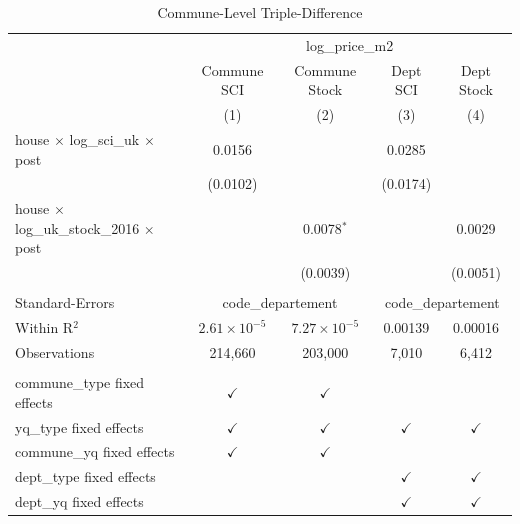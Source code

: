 
\begin{table}[htbp]
   \caption{\label{tab:commune} Commune-Level Triple-Difference}
   \bigskip
   \centering
   \begin{tabular}{lcccc}
      \toprule
       & \multicolumn{4}{c}{log\_price\_m2}\\
                                                             & Commune SCI           & Commune Stock         & Dept SCI      & Dept Stock \\   
                                                             & (1)                   & (2)                   & (3)           & (4)\\  
      \midrule 
      house $\times$ log\_sci\_uk $\times$ post              & 0.0156                &                       & 0.0285        &   \\   
                                                             & (0.0102)              &                       & (0.0174)      &   \\   
      house $\times$ log\_uk\_stock\_2016 $\times$ post      &                       & 0.0078$^{*}$          &               & 0.0029\\   
                                                             &                       & (0.0039)              &               & (0.0051)\\   
       \\
      Standard-Errors & \multicolumn{2}{c}{code\_departement} & \multicolumn{2}{c}{code\_departement} \\
      Within R$^2$                                           & $2.61\times 10^{-5}$  & $7.27\times 10^{-5}$  & 0.00139       & 0.00016\\  
      Observations                                           & 214,660               & 203,000               & 7,010         & 6,412\\  
       \\
      commune\_type fixed effects                            & $\checkmark$          & $\checkmark$          &               & \\  
      yq\_type fixed effects                                 & $\checkmark$          & $\checkmark$          & $\checkmark$  & $\checkmark$\\   
      commune\_yq fixed effects                              & $\checkmark$          & $\checkmark$          &               & \\  
      dept\_type fixed effects                               &                       &                       & $\checkmark$  & $\checkmark$\\   
      dept\_yq fixed effects                                 &                       &                       & $\checkmark$  & $\checkmark$\\   
      \bottomrule
   \end{tabular}
\end{table}


